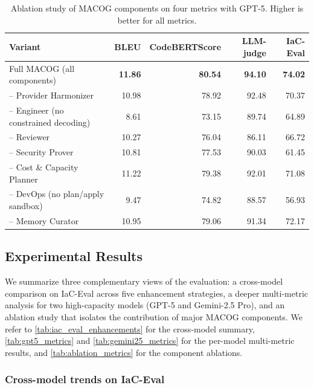 \documentclass[acmsmall,screen,review,anonymous]{acmart}
\begin{document}
\begin{table}[t]
\centering
\caption{Ablation study of MACOG components on four metrics with GPT-5. Higher is better for all metrics.}
\label{tab:ablation_metrics}
\small
\setlength{\tabcolsep}{6pt}
\begin{tabular}{@{}lrrrr@{}}
\toprule
\textbf{Variant} & \textbf{BLEU} & \textbf{CodeBERTScore} & \textbf{LLM-judge} & \textbf{IaC-Eval} \\
\midrule
Full MACOG (all components)           & \textbf{11.86} & \textbf{80.54} & \textbf{94.10} & \textbf{74.02} \\
\addlinespace[2pt]
-- Provider Harmonizer                & 10.98 & 78.92 & 92.48 & 70.37 \\
-- Engineer (no constrained decoding) &  8.61 & 73.15 & 89.74 & 64.89 \\
-- Reviewer                           & 10.27 & 76.04 & 86.11 & 66.72 \\
-- Security Prover                    & 10.81 & 77.53 & 90.03 & 61.45 \\
-- Cost \& Capacity Planner           & 11.22 & 79.38 & 92.01 & 71.08 \\
-- DevOps (no plan/apply sandbox)     &  9.47 & 74.82 & 88.57 & 56.93 \\
-- Memory Curator                     & 10.95 & 79.06 & 91.34 & 72.17 \\
\bottomrule
\end{tabular}
\end{table}


\subsection{Experimental Results}
\label{sec:exp-results}

We summarize three complementary views of the evaluation: a cross-model comparison on IaC-Eval \cite{kon2024iac} across five enhancement strategies, a deeper multi-metric analysis for two high-capacity models (GPT-5 and Gemini-2.5 Pro), and an ablation study that isolates the contribution of major MACOG components. We refer to \autoref{tab:iac_eval_enhancements} for the cross-model summary, \autoref{tab:gpt5_metrics} and \autoref{tab:gemini25_metrics} for the per-model multi-metric results, and \autoref{tab:ablation_metrics} for the component ablations.

\subsubsection{Cross-model trends on IaC-Eval}
\end{document}
